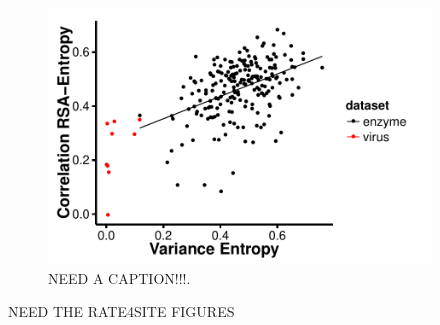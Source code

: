 \documentclass[12pt]{article}
\begin{document}
    \begin{figure}[H]
            \centerline{\includegraphics[width=4in]{var_entropy_rsa_cor.pdf}}
            \caption{NEED A CAPTION!!!.}
            \label{fig:seqent_structure_cors}
    \end{figure}

NEED THE RATE4SITE FIGURES
\end{document}
